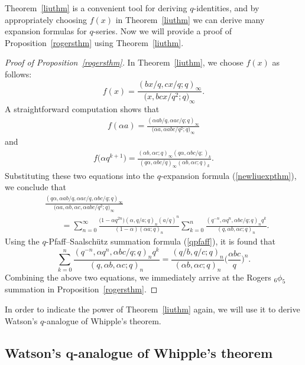 \documentclass[pdftex]{sigma}
\numberwithin{equation}{section}
\begin{document}
Theorem~\ref{liuthm} is a convenient tool for deriving $q$-identities, and by appropriately choosing $f(x)$ in Theorem~\ref{liuthm} we can derive many expansion formulas for $q$-series. Now we will provide a proof of Proposition~\ref{rogersthm} using Theorem~\ref{liuthm}.
\begin{proof}[Proof of Proposition~\ref{rogersthm}]
In Theorem~\ref{liuthm}, we choose $f(x)$ as follows:
\[
f(x)=\frac{(bx/q, cx/q; q)_\infty}{\bigl(x, bcx/q^2; q\bigr)_{\infty}}.
\]
A straightforward computation shows that
\begin{align*}
f(\alpha a)=\frac{(\alpha ab/q, \alpha ac/q; q)_\infty}{\bigl(\alpha a, \alpha a bc/q^2; q\bigr)_\infty}
\end{align*}
and
\begin{align*}
f\bigl(\alpha q^{k+1}\bigr)=\frac{(\alpha b, \alpha c; q)_\infty (q\alpha, \alpha bc/q; )_k}{(q\alpha, \alpha bc/q)_\infty (\alpha b, \alpha c; q)_k}.
\end{align*}
Substituting these two equations into the $q$-expansion formula (\ref{newliuexpthm}), we conclude that
{\samepage\begin{align*}	
&\frac{(q\alpha, \alpha ab/q, \alpha ac/q, \alpha bc/q; q)_\infty}
{\bigl(\alpha a, \alpha b, \alpha c, \alpha abc/q^2; q\bigr)_\infty}\\
&\qquad{}=\sum_{n=0}^\infty \frac{\bigl(1-\alpha q^{2n}\bigr)(\alpha, q/a; q)_n (a/q)^n}{(1-\alpha)(\alpha a; q)_n}	
\sum_{k=0}^n \frac{(q^{-n}, \alpha q^n, \alpha bc/q; q)_n q^k}
{(q, \alpha b, \alpha c; q)_n}.
\end{align*}}	
 Using the $q$-Pfaff--Saalsch\"utz summation formula (\ref{qpfaff}), it is found that
\begin{equation*}%
\sum_{k=0}^n \frac{(q^{-n}, \alpha q^n, \alpha bc/q; q)_n q^k}
{(q, \alpha b, \alpha c; q)_n}
=\frac{(q/b, q/c; q)_n}{(\alpha b, \alpha c; q)_n}\biggl(\frac{\alpha bc}{q}\biggr)^n.
\end{equation*}
Combining the above two equations, we immediately arrive at the Rogers $_6\phi_5$ summation in Proposition~\ref{rogersthm}.
\end{proof}

In order to indicate the power of Theorem~\ref{liuthm} again, we will use it to derive Watson's $q$-analogue of Whipple's theorem.

\subsection[Watson's q-analogue of Whipple's theorem]{Watson's $\boldsymbol{q}$-analogue of Whipple's theorem}
\end{document}

